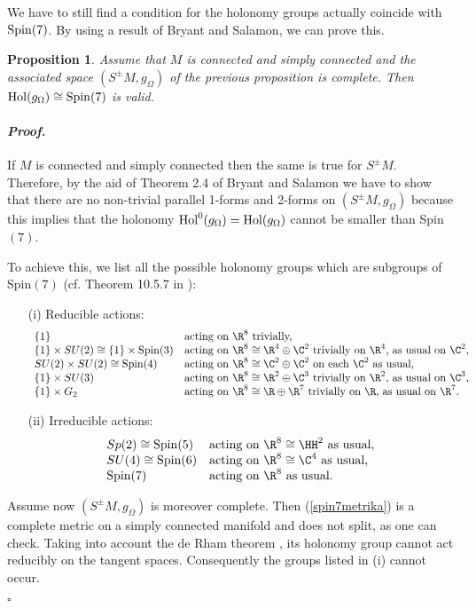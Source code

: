 \documentclass[a4paper,12pt,draft]{article}
\newtheorem{proposition}[theorem]{Proposition}
\newenvironment{proof}{\paragraph{\it Proof.}}{$\square$\vskip0.4cm}
\begin{document}
We have to still find a condition for the holonomy groups
actually coincide with ${\rm Spin}(7)$. By using a result of Bryant and
Salamon, we can prove this.
\begin{proposition}
Assume that $M$ is connected and simply connected and the associated
space $(S^\pm M, g_\Omega)$ of the previous proposition is complete. Then
${\rm Hol}(g_\Omega )\cong{\rm Spin}(7)$ is valid.
\end{proposition}
\begin{proof} If $M$ is connected and simply connected then the
same is true for $S^\pm M$. Therefore, by the aid of Theorem
2.4 of Bryant and Salamon \cite{bry-sal} we have to show that there are no
non-trivial parallel 1-forms and 2-forms on $(S^\pm M, g_\Omega )$ because
this implies that the holonomy ${\rm Hol}^0(g_\Omega )={\rm Hol}(g_\Omega
)$ cannot be smaller than Spin$(7)$. 

To achieve this, we list all the possible holonomy groups which are
subgroups of Spin$(7)$ (cf. Theorem 10.5.7 in \cite{joy}):
\begin{enumerate}
\item[(i)] Reducible actions:
\[\begin{array}{ll}
               \{ 1\} & \mbox{acting on $\R^8$ trivially,} \\
               \{ 1\}\times SU(2)\cong\{ 1\}\times{\rm Spin}(3) &
\mbox{acting on $\R^8\cong\R^4\oplus\C^2$ trivially on $\R^4$, as
usual on $\C^2$}, \\
               SU(2)\times SU(2)\cong{\rm Spin}(4) & \mbox{acting on
$\R^8\cong\C^2\oplus\C^2$ on each $\C^2$ as usual,} \\
               \{ 1\}\times SU(3) & \mbox{acting on
$\R^8\cong\R^2\oplus\C^3$ trivially on $\R^2$, as usual on $\C^3$,} \\
               \{ 1\}\times G_2   & \mbox{acting on
$\R^8\cong\R\oplus\R^7$ trivially on $\R$, as usual on $\R^7$.}
                        \end{array}\]

\item[(ii)] Irreducible actions:
\[\begin{array}{ll} 
             Sp(2)\cong{\rm Spin}(5) & \mbox{acting on $\R^8\cong\HH^2$
as usual,} \\
             SU(4)\cong{\rm Spin}(6) & \mbox{acting on $\R^8\cong\C^4$ as
usual,} \\
             {\rm Spin}(7) & \mbox{acting on $\R^8$ as usual.}
\end{array}\]
\end{enumerate}
Assume now $(S^\pm M, g_\Omega )$ is moreover complete. Then
(\ref{spin7metrika}) is a complete metric on a simply
connected manifold and does not split, as
one can check. Taking into account the de Rham theorem \cite{deR}, its
holonomy group cannot act reducibly on the tangent spaces. Consequently
the groups listed in (i) cannot occur.
             

\end{proof}
\end{document}
